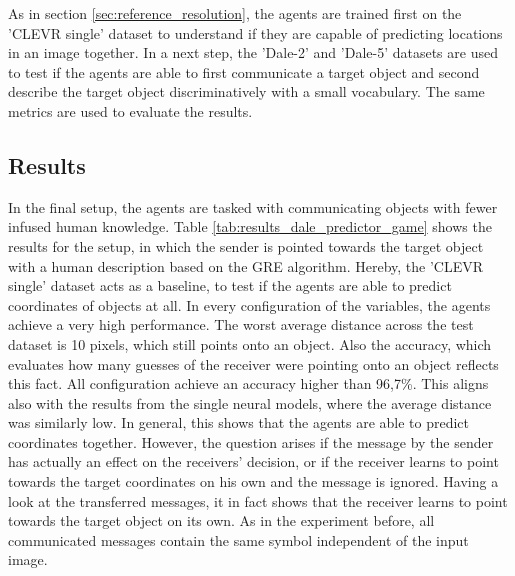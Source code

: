 As in section \ref{sec:reference_resolution}, the agents are trained first on the 'CLEVR single' dataset to understand if they are capable of predicting locations in an image together.
In a next step, the 'Dale-2' and 'Dale-5' datasets are used to test if the agents are able to first communicate a target object and second describe the target object discriminatively with a small vocabulary.
The same metrics are used to evaluate the results.

\subsection*{Results}
In the final setup, the agents are tasked with communicating objects with fewer infused human knowledge.
Table \ref{tab:results_dale_predictor_game} shows the results for the setup, in which the sender is pointed towards the target object with a human description based on the GRE algorithm.
Hereby, the 'CLEVR single' dataset acts as a baseline, to test if the agents are able to predict coordinates of objects at all.
In every configuration of the variables, the agents achieve a very high performance.
The worst average distance across the test dataset is 10 pixels, which still points onto an object.
Also the accuracy, which evaluates how many guesses of the receiver were pointing onto an object reflects this fact.
All configuration achieve an accuracy higher than 96,7\%.
This aligns also with the results from the single neural models, where the average distance was similarly low.
In general, this shows that the agents are able to predict coordinates together.
However, the question arises if the message by the sender has actually an effect on the receivers' decision, or if the receiver learns to point towards the target coordinates on his own and the message is ignored.
Having a look at the transferred messages, it in fact shows that the receiver learns to point towards the target object on its own.
As in the experiment before, all communicated messages contain the same symbol independent of the input image.

